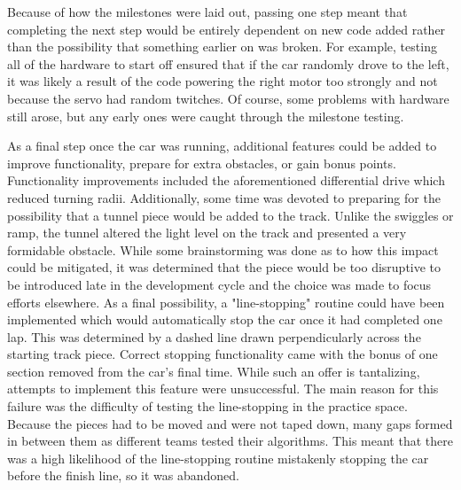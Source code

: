\documentclass[conference]{IEEEtran}
\begin{document}
    Because of how the milestones were laid out, passing one step meant that
    completing the next step would be entirely dependent on new code added
    rather than the possibility that something earlier on was broken. For
    example, testing all of the hardware to start off ensured that if the car
    randomly drove to the left, it was likely a result of the code powering
    the right motor too strongly and not because the servo had random
    twitches. Of course, some problems with hardware still arose, but any
    early ones were caught through the milestone testing.

    As a final step once the car was running, additional features could be
    added to improve functionality, prepare for extra obstacles, or gain bonus
    points. Functionality improvements included the aforementioned
    differential drive which reduced turning radii. Additionally, some time
    was devoted to preparing for the possibility that a tunnel piece would be
    added to the track. Unlike the swiggles or ramp, the tunnel altered the
    light level on the track and presented a very formidable obstacle. While
    some brainstorming was done as to how this impact could be mitigated, it
    was determined that the piece would be too disruptive to be introduced
    late in the development cycle and the choice was made to focus efforts
    elsewhere. As a final possibility, a "line-stopping" routine could have
    been implemented which would automatically stop the car once it had
    completed one lap. This was determined by a dashed line drawn
    perpendicularly across the starting track piece. Correct stopping
    functionality came with the bonus of one section removed from the car's
    final time. While such an offer is tantalizing, attempts to implement
    this feature were unsuccessful. The main reason for this failure was the
    difficulty of testing the line-stopping in the practice space. Because the
    pieces had to be moved and were not taped down, many gaps formed in
    between them as different teams tested their algorithms. This meant that
    there was a high likelihood of the line-stopping routine mistakenly
    stopping the car before the finish line, so it was abandoned.
\end{document}
